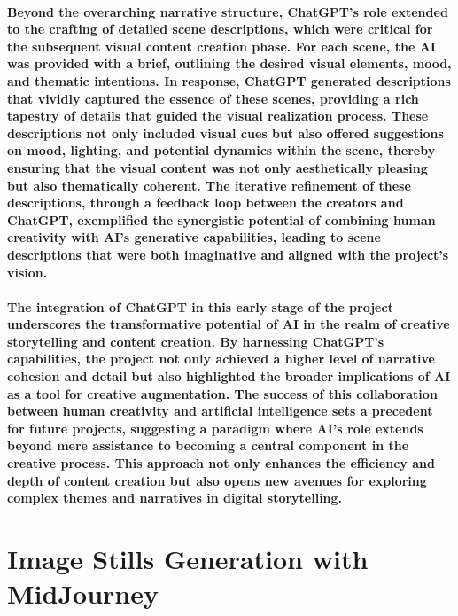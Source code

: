 \documentclass[11pt,a4paper,oneside]{report}
\begin{document}
\paragraph{Beyond the overarching narrative structure, ChatGPT's role extended to the crafting of detailed scene descriptions, which were critical for the subsequent visual content creation phase. For each scene, the AI was provided with a brief, outlining the desired visual elements, mood, and thematic intentions. In response, ChatGPT generated descriptions that vividly captured the essence of these scenes, providing a rich tapestry of details that guided the visual realization process. These descriptions not only included visual cues but also offered suggestions on mood, lighting, and potential dynamics within the scene, thereby ensuring that the visual content was not only aesthetically pleasing but also thematically coherent. The iterative refinement of these descriptions, through a feedback loop between the creators and ChatGPT, exemplified the synergistic potential of combining human creativity with AI's generative capabilities, leading to scene descriptions that were both imaginative and aligned with the project's vision.}

\paragraph{The integration of ChatGPT in this early stage of the project underscores the transformative potential of AI in the realm of creative storytelling and content creation. By harnessing ChatGPT's capabilities, the project not only achieved a higher level of narrative cohesion and detail but also highlighted the broader implications of AI as a tool for creative augmentation. The success of this collaboration between human creativity and artificial intelligence sets a precedent for future projects, suggesting a paradigm where AI's role extends beyond mere assistance to becoming a central component in the creative process. This approach not only enhances the efficiency and depth of content creation but also opens new avenues for exploring complex themes and narratives in digital storytelling.}

\section{Image Stills Generation with MidJourney}
\end{document}
